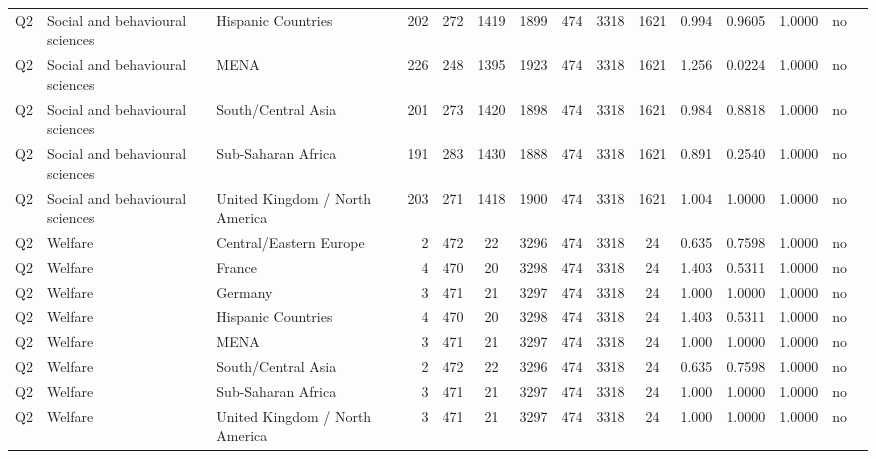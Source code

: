 \begin{longtable}{lllrcccccccccll}
Q2 & Social and behavioural sciences & Hispanic Countries & 202 & 272 & 1419 & 1899 & 474 & 3318 & 1621 & 0.994 & 0.9605 & 1.0000 & no \\
Q2 & Social and behavioural sciences & MENA & 226 & 248 & 1395 & 1923 & 474 & 3318 & 1621 & 1.256 & 0.0224 & 1.0000 & no \\
Q2 & Social and behavioural sciences & South/Central Asia & 201 & 273 & 1420 & 1898 & 474 & 3318 & 1621 & 0.984 & 0.8818 & 1.0000 & no \\
Q2 & Social and behavioural sciences & Sub-Saharan Africa & 191 & 283 & 1430 & 1888 & 474 & 3318 & 1621 & 0.891 & 0.2540 & 1.0000 & no \\
Q2 & Social and behavioural sciences & United Kingdom / North America & 203 & 271 & 1418 & 1900 & 474 & 3318 & 1621 & 1.004 & 1.0000 & 1.0000 & no \\
Q2 & Welfare & Central/Eastern Europe & 2 & 472 & 22 & 3296 & 474 & 3318 & 24 & 0.635 & 0.7598 & 1.0000 & no \\
Q2 & Welfare & France & 4 & 470 & 20 & 3298 & 474 & 3318 & 24 & 1.403 & 0.5311 & 1.0000 & no \\
Q2 & Welfare & Germany & 3 & 471 & 21 & 3297 & 474 & 3318 & 24 & 1.000 & 1.0000 & 1.0000 & no \\
Q2 & Welfare & Hispanic Countries & 4 & 470 & 20 & 3298 & 474 & 3318 & 24 & 1.403 & 0.5311 & 1.0000 & no \\
Q2 & Welfare & MENA & 3 & 471 & 21 & 3297 & 474 & 3318 & 24 & 1.000 & 1.0000 & 1.0000 & no \\
Q2 & Welfare & South/Central Asia & 2 & 472 & 22 & 3296 & 474 & 3318 & 24 & 0.635 & 0.7598 & 1.0000 & no \\
Q2 & Welfare & Sub-Saharan Africa & 3 & 471 & 21 & 3297 & 474 & 3318 & 24 & 1.000 & 1.0000 & 1.0000 & no \\
Q2 & Welfare & United Kingdom / North America & 3 & 471 & 21 & 3297 & 474 & 3318 & 24 & 1.000 & 1.0000 & 1.0000 & no \\
\end{longtable}
